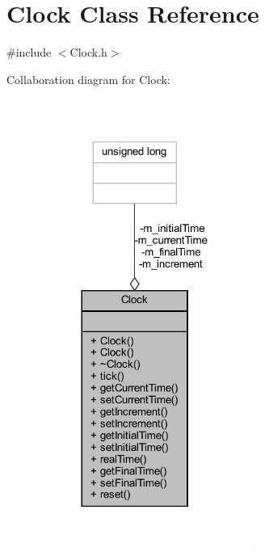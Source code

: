 \hypertarget{class_clock}{}\section{Clock Class Reference}
\label{class_clock}


{\ttfamily \#include $<$Clock.\+h$>$}



Collaboration diagram for Clock\+:\nopagebreak
\begin{figure}[H]
\begin{center}
\leavevmode
\includegraphics[width=197pt]{class_clock__coll__graph}
\end{center}
\end{figure}
